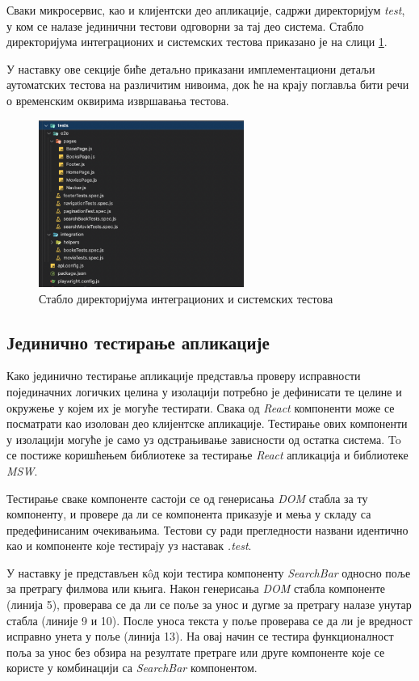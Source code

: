 \documentclass[12pt,oneside]{memoir}
\begin{document}
Сваки микросервис, као и клијентски део апликације, садржи директоријум \textit{test}, у ком се налазе јединични тестови одговорни за тај део система. Стабло директоријума интеграционих и системских тестова приказано је на слици \ref{fig:testTree}.
 
 У наставку ове секције биће детаљно приказани имплементациони детаљи аутоматских тестова на различитим нивоима, док ће на крају поглавља бити речи о временским оквирима извршавања тестова.
  
 \begin{figure}[!ht]
  \centering
  \includegraphics[width=0.6\textwidth]{matfmaster/img/testTree.png}
  \caption{Стабло директоријума интеграционих и системских тестова}
  \label{fig:testTree}
\end{figure}

\subsection{Јединично тестирање апликације}

Како јединично тестирање апликације представља проверу исправности појединачних логичких целина у изолацији потребно је дефинисати те целине и окружење у којем их је могуће тестирати. Свака од \textit{React} компоненти може се посматрати као изолован део клијентске апликације. Тестирање ових компоненти у изолацији могуће је само уз одстрањивање зависности од остатка система. To се постиже коришћењем библиотеке за тестирање \textit{React} апликација и библиотеке \textit{MSW}.

Тестирање сваке компоненте састоји се од генерисања \textit{DOM} стабла за ту компоненту, и провере да ли се компонента приказује и мења у складу са предефинисаним очекивањима. Тестови су ради прегледности названи идентично као и компоненте које тестирају уз наставак \textit{.test}. 

У наставку је представљен  к\^{o}д који тестира компоненту \textit{SearchBar} односно поље за претрагу филмова или књига. Након генерисања \textit{DOM} стабла компоненте (линија 5), проверава се да ли се поље за унос и дугме за претрагу налазе унутар стабла (линије 9 и 10). После уноса текста у поље проверава се да ли је вредност исправно унета у поље (линија 13). На овај начин се тестира функционалност поља за унос без обзира на резултате претраге или друге компоненте које се користе у комбинацији са \textit{SearchBar} компонентом.
\end{document}
